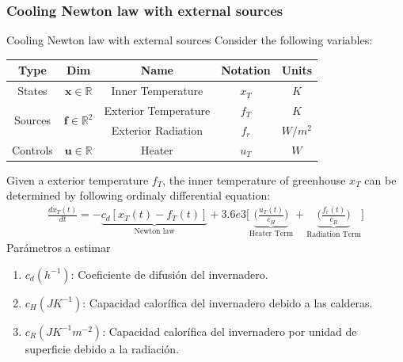     \subsubsection{Cooling Newton law with external sources}
    
    \begin{model}{Cooling Newton law with external sources}{}\label{model:CoolNewton}
    Consider the following variables: 
    \begin{center}
        \begin{tabular}{|c|c|c|c|c|}
            \hline
            \textbf{Type} & \textbf{Dim} &\textbf{Name} & \textbf{Notation} & \textbf{Units} \\
                \hline
                \multirow{1}{*}{States}  & $\bm{x} \in \mathbb{R}$& Inner Temperature & $x_{T}$ & $K$ \\
                \hline
                \hline
                \multirow{2}{*}{Sources} & \multirow{2}{*}{$\bm{f} \in \mathbb{R}^2$} & Exterior Temperature & $f_{T}$ & $K$ \\
                & & Exterior Radiation & $f_{r}$ & $W/m^2$ \\
                \hline
                \hline
                \multirow{1}{*}{Controls} & $\bm{u} \in \mathbb{R}$ & Heater         & $u_{T}$ & $W$ \\
                \hline
        \end{tabular}    
    \end{center}
        Given a exterior temperature $f_{T}$, the inner temperature of greenhouse $x_{T}$ can be determined by following ordinaly differential equation:  
        \begin{gather}\label{eq:CoolNewton_plus_sources}
            \frac{dx_{T}(t)}{dt} = -\underbrace{c_d[x_{T}(t) - f_{T}(t)]}_{\text{Newton law}} + 
            3.6e3  \Bigg[ 
                \underbrace{ \Bigg( \frac{u_{T}(t)}{c_H} \Bigg) }_{\text{Heater Term}} + 
                \underbrace{ \Bigg( \frac{f_{r}(t)}{ c_R } \Bigg) }_{\text{Radiation Term}} \Bigg]
        \end{gather}
        Parámetros a estimar 
        \begin{enumerate}
            \item $c_d( h^{-1})$: Coeficiente de difusión del invernadero.
            \item $c_H(JK^{-1})$: Capacidad calorífica del invernadero debido a las calderas.
            \item $c_R(JK^{-1}m^{-2})$: Capacidad calorífica del invernadero por unidad de superficie debido a la radiación.
        \end{enumerate}
    \end{model}
    
